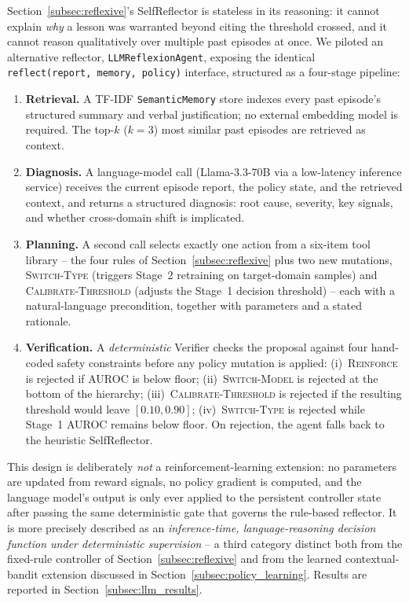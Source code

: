 \documentclass[conference]{IEEEtran}
\begin{document}
Section~\ref{subsec:reflexive}'s SelfReflector is stateless in its
reasoning: it cannot explain \emph{why} a lesson was warranted beyond
citing the threshold crossed, and it cannot reason qualitatively over
multiple past episodes at once. We piloted an alternative reflector,
\texttt{LLMReflexionAgent}, exposing the identical
\texttt{reflect(report, memory, policy)} interface, structured as a
four-stage pipeline:
\begin{enumerate}
\item \textbf{Retrieval.} A TF-IDF \texttt{SemanticMemory} store indexes
every past episode's structured summary and verbal justification; no
external embedding model is required. The top-$k$ ($k{=}3$) most similar
past episodes are retrieved as context.
\item \textbf{Diagnosis.} A language-model call (Llama-3.3-70B
\cite{llama3} via a low-latency inference service) receives the current
episode report, the policy state, and the retrieved context, and returns
a structured diagnosis: root cause, severity, key signals, and whether
cross-domain shift is implicated.
\item \textbf{Planning.} A second call selects exactly one action from a
six-item tool library -- the four rules of
Section~\ref{subsec:reflexive} plus two new mutations,
\textsc{Switch-Type} (triggers Stage~2 retraining on target-domain
samples) and \textsc{Calibrate-Threshold} (adjusts the Stage~1 decision
threshold) -- each with a natural-language precondition, together with
parameters and a stated rationale.
\item \textbf{Verification.} A \emph{deterministic} Verifier checks the
proposal against four hand-coded safety constraints before any policy
mutation is applied: (i)~\textsc{Reinforce} is rejected if AUROC is below
floor; (ii)~\textsc{Switch-Model} is rejected at the bottom of the
hierarchy; (iii)~\textsc{Calibrate-Threshold} is rejected if the
resulting threshold would leave $[0.10,0.90]$; (iv)~\textsc{Switch-Type}
is rejected while Stage~1 AUROC remains below floor. On rejection, the
agent falls back to the heuristic SelfReflector.
\end{enumerate}

This design is deliberately \emph{not} a reinforcement-learning
extension: no parameters are updated from reward signals, no policy
gradient is computed, and the language model's output is only ever
applied to the persistent controller state after passing the same
deterministic gate that governs the rule-based reflector. It is more
precisely described as an \emph{inference-time, language-reasoning
decision function under deterministic supervision} -- a third category
distinct both from the fixed-rule controller of
Section~\ref{subsec:reflexive} and from the learned contextual-bandit
extension discussed in Section~\ref{subsec:policy_learning}. Results are
reported in Section~\ref{subsec:llm_results}.
\end{document}
